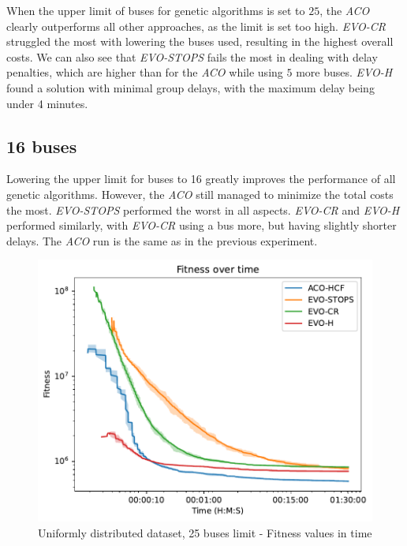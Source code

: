 When the upper limit of buses for genetic algorithms is set to $25$, the \textit{ACO} clearly outperforms all other approaches, as the limit is set too high. \textit{EVO-CR} struggled the most with lowering the buses used, resulting in the highest overall costs. We can also see that \textit{EVO-STOPS} fails the most in dealing with delay penalties, which are higher than for the \textit{ACO} while using $5$ more buses. \textit{EVO-H} found a solution with minimal group delays, with the maximum delay being under 4 minutes.

\subsection{16 buses}

Lowering the upper limit for buses to 16 greatly improves the performance of all genetic algorithms. However, the \textit{ACO} still managed to minimize the total costs the most. \textit{EVO-STOPS} performed the worst in all aspects. \textit{EVO-CR} and \textit{EVO-H} performed similarly, with \textit{EVO-CR} using a bus more, but having slightly shorter delays. The \textit{ACO} run is the same as in the previous experiment.

\clearpage

\begin{figure}
    \centering
    \includegraphics[width=1\linewidth]
    {img/exp_random_25b_100_time.pdf}
    \caption{Uniformly distributed dataset, 25 buses limit - Fitness values in time}
    \label{fig:exp_random_25}
\end{figure}

